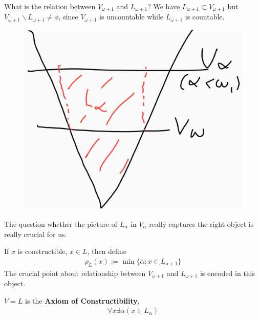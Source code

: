 \documentclass[12pt,a4paper]{article}
\begin{document}
What is the relation between $V_{\omega +1}$ and $L_{\omega +1}$? We have $L_{\omega+1} \subset V_{\omega+1}$ but $V_{\omega +1} \backslash L_{\omega +1} \neq \phi$, since $V_{\omega +1}$ is uncountable while $L_{\omega +1}$ is countable.

\begin{figure}[h]
\begin{center}
    \includegraphics[scale=0.13]{8}
\end{center}
\end{figure}

\quad The question whether the picture of $L_{\alpha}$ in $V_{\alpha}$ really captures the right object is really crucial for us.
\s

 If $x$ is constructible, $x\in L$, then define
\begin{align*}
\rho_L(x) := \min \{\alpha : x\in L_{\alpha +1}\}
\end{align*}
The crucial point about relationship between $V_{\omega +1}$ and $L_{\omega +1}$ is encoded in this object.
\s

 $V=L$ is the \textbf{Axiom of Constructibility},
\begin{align*}
\forall x \exists \alpha (x\in L_{\alpha})
\end{align*}
\s
\end{document}

